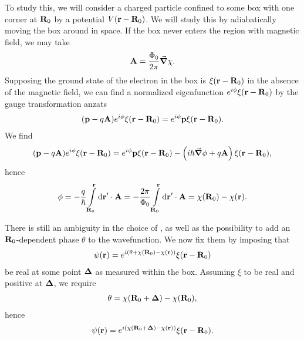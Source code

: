 To study this, we will consider a charged particle confined to some box with one corner at $\vb{R}_{0}$ by a potential $V(\vb{r} - \vb{R}_{0})$. We will study this by adiabatically moving the box around in space. If the box never enters the region with magnetic field, we may take
\begin{align*}
	\vb{A} = \frac{\Phi_{0}}{2\pi}\grad{\chi}.
\end{align*}
Supposing the ground state of the electron in the box is $\xi(\vb{r} - \vb{R}_{0})$ in the absence of the magnetic field, we can find a normalized eigenfunction $e^{i\phi}\xi(\vb{r} - \vb{R}_{0})$ by the gauge transformation anzats
\begin{align*}
	(\vb{p} - q\vb{A})e^{i\phi}\xi(\vb{r} - \vb{R}_{0}) = e^{i\phi}\vb{p}\xi(\vb{r} - \vb{R}_{0}).
\end{align*}
We find
\begin{align*}
	(\vb{p} - q\vb{A})e^{i\phi}\xi(\vb{r} - \vb{R}_{0}) = e^{i\phi}\vb{p}\xi(\vb{r} - \vb{R}_{0}) - \left(i\hbar\grad{\phi} + q\vb{A}\right)\xi(\vb{r} - \vb{R}_{0}),
\end{align*}
hence
\begin{align*}
	\phi = -\frac{q}{\hbar}\int\limits_{\vb{R}_{0}}^{\vb{r}}\dd{\vb{r}\ensuremath{^{\prime}}}\cdot\vb{A} = -\frac{2\pi}{\Phi_{0}}\int\limits_{\vb{R}_{0}}^{\vb{r}}\dd{\vb{r}\ensuremath{^{\prime}}}\cdot\vb{A} = \chi(\vb{R}_{0}) - \chi(\vb{r}).
\end{align*}

There is still an ambiguity in the choice of \chi, as well as the possibility to add an $\vb{R}_{0}$-dependent phase $\theta$ to the wavefunction. We now fix them by imposing that
\begin{align*}
	\psi(\vb{r}) = e^{i(\theta + \chi(\vb{R}_{0}) - \chi(\vb{r}))}\xi(\vb{r} - \vb{R}_{0})
\end{align*}
be real at some point $\vb*{\Delta}$ as measured within the box. Assuming $\xi$ to be real and positive at $\vb*{\Delta}$, we require
\begin{align*}
	\theta = \chi(\vb{R}_{0} + \vb*{\Delta}) - \chi(\vb{R}_{0}),
\end{align*}
hence
\begin{align*}
	\psi(\vb{r}) = e^{i(\chi(\vb{R}_{0} + \vb*{\Delta}) - \chi(\vb{r}))}\xi(\vb{r} - \vb{R}_{0}).
\end{align*}

